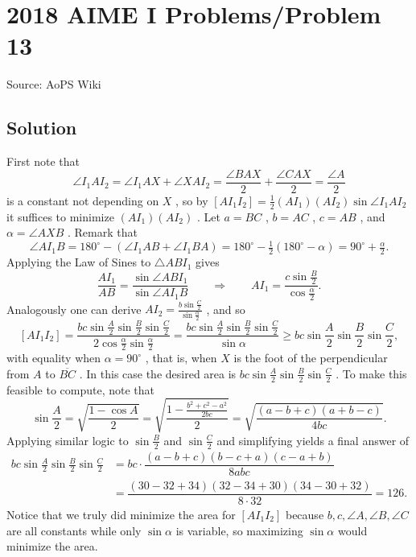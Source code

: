 \documentclass[12pt]{article}
\begin{document}
\section*{{2018 AIME I Problems/Problem 13}}
Source: AoPS Wiki

\subsection*{Solution}
First note that \[\angle I_1AI_2 = \angle I_1AX + \angle XAI_2 = \frac{\angle BAX}2 + \frac{\angle CAX}2 = \frac{\angle A}2\] is a constant not depending on $X$ , so by $[AI_1I_2] = \tfrac12(AI_1)(AI_2)\sin\angle I_1AI_2$ it suffices to minimize $(AI_1)(AI_2)$ . Let $a = BC$ , $b = AC$ , $c = AB$ , and $\alpha = \angle AXB$ . Remark that \[\angle AI_1B = 180^\circ - (\angle I_1AB + \angle I_1BA) = 180^\circ - \tfrac12(180^\circ - \alpha) = 90^\circ + \tfrac\alpha 2.\] Applying the Law of Sines to $\triangle ABI_1$ gives \[\frac{AI_1}{AB} = \frac{\sin\angle ABI_1}{\sin\angle AI_1B}\qquad\Rightarrow\qquad AI_1 = \frac{c\sin\frac B2}{\cos\frac\alpha 2}.\] Analogously one can derive $AI_2 = \tfrac{b\sin\frac C2}{\sin\frac\alpha 2}$ , and so \[[AI_1I_2] = \frac{bc\sin\frac A2 \sin\frac B2\sin\frac C2}{2\cos\frac\alpha 2\sin\frac\alpha 2} = \frac{bc\sin\frac A2 \sin\frac B2\sin\frac C2}{\sin\alpha}\geq bc\sin\frac A2 \sin\frac B2\sin\frac C2,\] with equality when $\alpha = 90^\circ$ , that is, when $X$ is the foot of the perpendicular from $A$ to $\overline{BC}$ . In this case the desired area is $bc\sin\tfrac A2\sin\tfrac B2\sin\tfrac C2$ . To make this feasible to compute, note that \[\sin\frac A2=\sqrt{\frac{1-\cos A}2}=\sqrt{\frac{1-\frac{b^2+c^2-a^2}{2bc}}2} = \sqrt{\dfrac{(a-b+c)(a+b-c)}{4bc}}.\] Applying similar logic to $\sin \tfrac B2$ and $\sin\tfrac C2$ and simplifying yields a final answer of \begin{align*}bc\sin\frac A2\sin\frac B2\sin\frac C2&=bc\cdot\dfrac{(a-b+c)(b-c+a)(c-a+b)}{8abc}\\&=\dfrac{(30-32+34)(32-34+30)(34-30+32)}{8\cdot 32}=\boxed{126}.\end{align*} Notice that we truly did minimize the area for $[A I_1 I_2]$ because $b, c, \angle A, \angle B, \angle C$ are all constants while only $\sin \alpha$ is variable, so maximizing $\sin \alpha$ would minimize the area.
\end{document}
